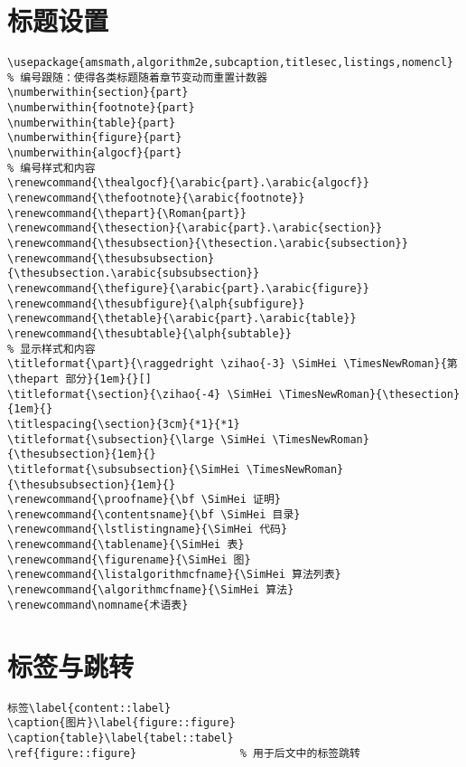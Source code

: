 \section{标题设置}
\begin{lstlisting}[style = LaTeX_TeXworks]
\usepackage{amsmath,algorithm2e,subcaption,titlesec,listings,nomencl}
% 编号跟随：使得各类标题随着章节变动而重置计数器
\numberwithin{section}{part}
\numberwithin{footnote}{part}
\numberwithin{table}{part}
\numberwithin{figure}{part}
\numberwithin{algocf}{part}
% 编号样式和内容
\renewcommand{\thealgocf}{\arabic{part}.\arabic{algocf}}
\renewcommand{\thefootnote}{\arabic{footnote}}
\renewcommand{\thepart}{\Roman{part}}
\renewcommand{\thesection}{\arabic{part}.\arabic{section}}
\renewcommand{\thesubsection}{\thesection.\arabic{subsection}}
\renewcommand{\thesubsubsection}{\thesubsection.\arabic{subsubsection}}
\renewcommand{\thefigure}{\arabic{part}.\arabic{figure}}
\renewcommand{\thesubfigure}{\alph{subfigure}}
\renewcommand{\thetable}{\arabic{part}.\arabic{table}}
\renewcommand{\thesubtable}{\alph{subtable}}
% 显示样式和内容
\titleformat{\part}{\raggedright \zihao{-3} \SimHei \TimesNewRoman}{第 \thepart 部分}{1em}{}[]
\titleformat{\section}{\zihao{-4} \SimHei \TimesNewRoman}{\thesection}{1em}{}
\titlespacing{\section}{3cm}{*1}{*1}
\titleformat{\subsection}{\large \SimHei \TimesNewRoman}{\thesubsection}{1em}{}
\titleformat{\subsubsection}{\SimHei \TimesNewRoman}{\thesubsubsection}{1em}{}
\renewcommand{\proofname}{\bf \SimHei 证明}
\renewcommand{\contentsname}{\bf \SimHei 目录}
\renewcommand{\lstlistingname}{\SimHei 代码}
\renewcommand{\tablename}{\SimHei 表}
\renewcommand{\figurename}{\SimHei 图}
\renewcommand{\listalgorithmcfname}{\SimHei 算法列表}
\renewcommand{\algorithmcfname}{\SimHei 算法}
\renewcommand\nomname{术语表}
\end{lstlisting}
\section{标签与跳转}
\begin{lstlisting}[style = LaTeX_TeXworks]
标签\label{content::label}
\caption{图片}\label{figure::figure}	
\caption{table}\label{tabel::tabel}	
\ref{figure::figure}				% 用于后文中的标签跳转
\end{lstlisting}
